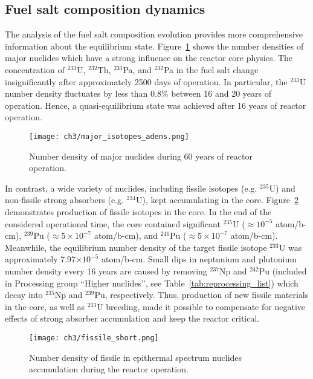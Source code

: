 \subsection{Fuel salt composition dynamics}
The analysis of the fuel salt composition evolution provides more comprehensive 
information about the equilibrium state. Figure~\ref{fig:adens_eq} shows the 
number densities of major nuclides which have a strong influence on the reactor 
core physics. The concentration of $^{233}$U, $^{232}$Th, $^{233}$Pa, and 
$^{232}$Pa in the fuel salt change insignificantly after approximately 2500 
days of operation. In particular, the $^{233}$U number density fluctuates by 
less than 0.8\% between 16 and 20 years of operation. Hence, a 
quasi-equilibrium state was achieved after 16 years of reactor operation.
\begin{figure}[ht!] %
	\centering
	\texttt{[image: ch3/major\_isotopes\_adens.png]}
	\caption{Number density of major nuclides during 60 years of reactor 
		operation.}
	\label{fig:adens_eq}
\end{figure}
In contrast, a wide variety of nuclides, including fissile isotopes (e.g. 
$^{235}$U) and non-fissile strong absorbers (e.g. $^{234}$U), kept accumulating 
in the core. Figure~\ref{fig:fissile_short} demonstrates production of fissile 
isotopes in the core. In the end of the considered operational time, the core 
contained significant $^{235}$U ($\approx10^{-5}$ atom/b-cm), $^{239}$Pu 
($\approx5\times10^{-7}$ atom/b-cm), and $^{241}$Pu ($\approx 5\times10^{-7}$ 
atom/b-cm). Meanwhile, the equilibrium number density of the target fissile 
isotope $^{233}$U was approximately 7.97$\times10^{-5}$ atom/b-cm. Small dips 
in neptunium and plutonium number density every 16 years are caused by removing
$^{237}$Np and $^{242}$Pu (included in Processing group ``Higher nuclides'', see
Table~\ref{tab:reprocessing_list}) which decay into $^{235}$Np and $^{239}$Pu, 
respectively. Thus, production of new fissile materials in the core, as well as 
$^{233}$U breeding, made it possible to compensate for negative effects of 
strong absorber accumulation and keep the reactor critical.
\begin{figure}[htp!] %
	\centering
	\texttt{[image: ch3/fissile\_short.png]}
	\caption{Number density of fissile in epithermal spectrum nuclides 
		accumulation during the reactor operation.}
	\label{fig:fissile_short}
\end{figure}

